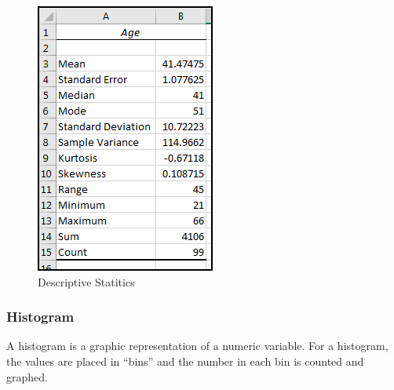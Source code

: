 \begin{figure}[H]
	\centering
	\includegraphics[width=\maxwidth{.40\linewidth}]{gfx/ch09_fig61}
	\caption{Descriptive Statitics}
	\label{09:fig61}
\end{figure}

\subsubsection{Histogram}

A histogram is a graphic representation of a numeric variable. For a histogram, the values are placed in ``bins'' and the number in each bin is counted and graphed. 

